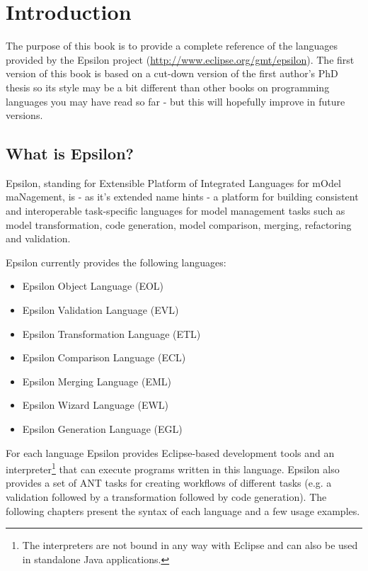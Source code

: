 \chapter{Introduction}
\label{chp:Introduction}

The purpose of this book is to provide a complete reference of the languages provided by the Epsilon project (\url{http://www.eclipse.org/gmt/epsilon}). The first version of this book is based on a cut-down version of the first author's PhD thesis so its style may be a bit different than other books on programming languages you may have read so far - but this will hopefully improve in future versions.

\section{What is Epsilon?}

Epsilon, standing for Extensible Platform of Integrated Languages for mOdel maNagement, is - as it's extended name hints - a platform for building consistent and interoperable task-specific languages for model management tasks such as model transformation, code generation, model comparison, merging, refactoring and validation.

Epsilon currently provides the following languages:

\begin{itemize}
	\item Epsilon Object Language (EOL)
	\item Epsilon Validation Language (EVL)
	\item Epsilon Transformation Language (ETL)
	\item Epsilon Comparison Language (ECL)
	\item Epsilon Merging Language (EML)
	\item Epsilon Wizard Language (EWL)
	\item Epsilon Generation Language (EGL)
\end{itemize}

For each language Epsilon provides Eclipse-based development tools and an interpreter\footnote{The interpreters are not bound in any way with Eclipse and can also be used in standalone Java applications.} that can execute programs written in this language. Epsilon also provides a set of ANT tasks for creating workflows of different tasks (e.g. a validation followed by a transformation followed by code generation). The following chapters present the syntax of each language and a few usage examples.

